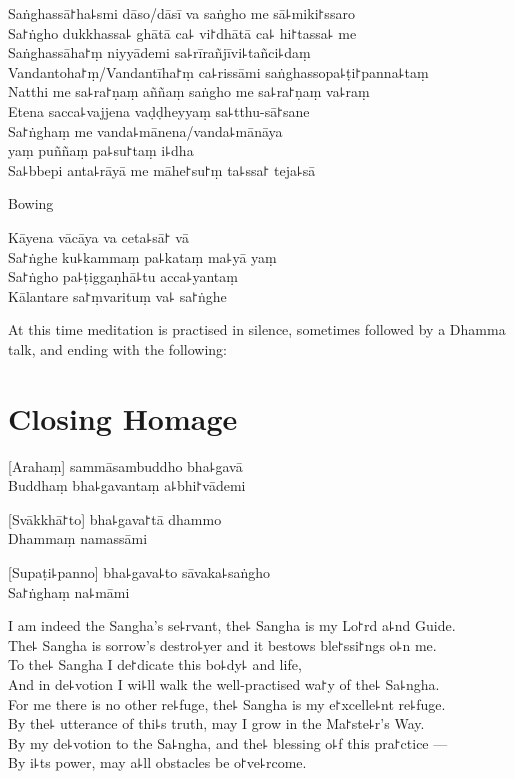 \enlargethispage{\baselineskip}
\clearpage

Saṅghassā꜓ha꜕smi dāso/dāsī va saṅgho me sā꜕miki꜓ssaro\\%
Sa꜓ṅgho dukkhassa꜕ ghātā ca꜕ vi꜓dhātā ca꜕ hi꜓tassa꜕ me\\
Saṅghassāha꜓ṃ niyyādemi sa꜕rīrañjīvi꜕tañci꜕daṃ\\
Vandantoha꜓ṃ/Vandantīha꜓ṃ ca꜕rissāmi saṅghassopa꜕ṭi꜓panna꜕taṃ\\
Natthi me sa꜕ra꜓ṇaṃ aññaṃ saṅgho me sa꜕ra꜓ṇaṃ va꜕raṃ\\
Etena sacca꜕vajjena vaḍḍheyyaṃ sa꜕tthu-sā꜓sane\\
Sa꜓ṅghaṃ me vanda꜕mānena/vanda꜕mānāya\\
\vin yaṃ puññaṃ pa꜕su꜓taṃ i꜕dha\\
Sa꜕bbepi anta꜕rāyā me māhe꜓su꜓ṃ ta꜕ssa꜓ teja꜕sā

\begin{instruction}
  Bowing
\end{instruction}

Kāyena vācāya va ceta꜕sā꜓ vā\\
Sa꜓ṅghe ku꜕kammaṃ pa꜕kataṃ ma꜕yā yaṃ\\
Sa꜓ṅgho pa꜕ṭiggaṇhā꜕tu acca꜕yantaṃ\\
Kālantare sa꜓ṃvarituṃ va꜕ sa꜓ṅghe

\vfill

\begin{instruction}
  At this time meditation is practised in silence, sometimes followed by a Dhamma talk, and ending with the following:
\end{instruction}

\chapter{Closing Homage}%

[Arahaṃ] sammāsambuddho bha꜕gavā\\
Buddhaṃ bha꜕gavantaṃ a꜕bhi꜓vādemi 

[Svākkhā꜓to] bha꜕gava꜓tā dhammo\\
Dhammaṃ namassāmi 

[Supaṭi꜕panno] bha꜕gava꜕to sāvaka꜕saṅgho\\
Sa꜓ṅghaṃ na꜕māmi 

\clearpage

I am indeed the Sangha's se꜕rvant, the꜕ Sangha is my Lo꜓rd a꜕nd Guide.\\%
The꜕ Sangha is sorrow's destro꜕yer and it bestows ble꜓ssi꜓ngs o꜕n me.\\
To the꜕ Sangha I de꜓dicate this bo꜕dy꜕ and life,\\
And in de꜕votion I wi꜕ll walk the well-practised wa꜓y of the꜕ Sa꜕ngha.\\
For me there is no other re꜕fuge, the꜕ Sangha is my e꜓xcelle꜕nt re꜕fuge.\\
By the꜕ utterance of thi꜕s truth, may I grow in the Ma꜓ste꜕r's Way.\\
By my de꜕votion to the Sa꜕ngha, and the꜕ blessing o꜕f this pra꜓ctice ---\\
By i꜕ts power, may a꜕ll obstacles be o꜓ve꜕rcome.

